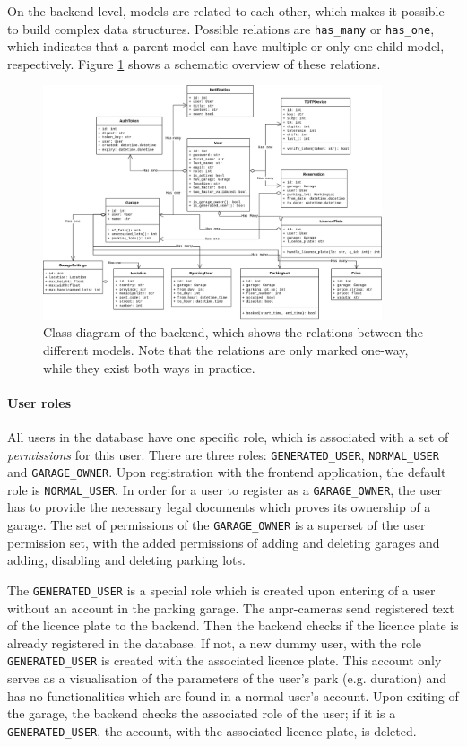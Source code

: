 \ind On the backend level, models are related to each other, which makes it possible to build complex data structures. Possible relations are \verb|has_many| or \verb|has_one|, which indicates that a parent model can have multiple or only one child model, respectively. Figure \ref{fig:class_diagram} shows a schematic overview of these relations. 

\begin{figure}
    \centering
    \includegraphics[width=10cm]{images/class_diagram.drawio.png}
    \caption[Class diagram of the backend.]{Class diagram of the backend, which shows the relations between the different models. Note that the relations are only marked one-way, while they exist both ways in practice.}
    \label{fig:class_diagram}
\end{figure}

\paragraph{User roles}\label{sec:backend-roles}
All users in the database have one specific role, which is associated with a set of \textit{permissions} for this user. There are three roles: \verb|GENERATED_USER|, \verb|NORMAL_USER| and \verb|GARAGE_OWNER|. Upon registration with the frontend application, the default role is \verb|NORMAL_USER|. In order for a user to register as a \verb|GARAGE_OWNER|, the user has to provide the necessary legal documents which proves its ownership of a garage. The set of permissions of the \verb|GARAGE_OWNER| is a superset of the user permission set, with the added permissions of adding and deleting garages and adding, disabling and deleting parking lots.

\ind The \verb|GENERATED_USER| is a special role which is created upon entering of a user without an account in the parking garage. The \ac{anpr}-cameras send registered text of the licence plate to the backend. Then the backend checks if the licence plate is already registered in the database. If not, a new dummy user, with the role \verb|GENERATED_USER| is created with the associated licence plate. This account only serves as a visualisation of the parameters of the user's park (e.g. duration) and has no functionalities which are found in a normal user's account. Upon exiting of the garage, the backend checks the associated role of the user; if it is a \verb|GENERATED_USER|, the account, with the associated licence plate, is deleted.

